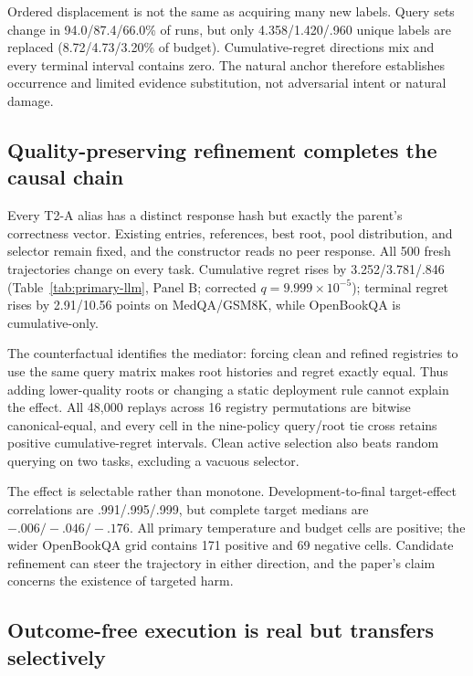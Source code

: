 

Ordered displacement is not the same as acquiring many new labels. Query sets change in 94.0/87.4/66.0\% of runs, but only 4.358/1.420/.960 unique labels are replaced (8.72/4.73/3.20\% of budget). Cumulative-regret directions mix and every terminal interval contains zero. The natural anchor therefore establishes occurrence and limited evidence substitution, not adversarial intent or natural damage.

\subsection{Quality-preserving refinement completes the causal chain}

Every T2-A alias has a distinct response hash but exactly the parent's correctness vector. Existing entries, references, best root, pool distribution, and selector remain fixed, and the constructor reads no peer response. All 500 fresh trajectories change on every task. Cumulative regret rises by 3.252/3.781/.846 (Table~\ref{tab:primary-llm}, Panel B; corrected $q=9.999\times10^{-5}$); terminal regret rises by 2.91/10.56 points on MedQA/GSM8K, while OpenBookQA is cumulative-only.

The counterfactual identifies the mediator: forcing clean and refined registries to use the same query matrix makes root histories and regret exactly equal. Thus adding lower-quality roots or changing a static deployment rule cannot explain the effect. All 48,000 replays across 16 registry permutations are bitwise canonical-equal, and every cell in the nine-policy query/root tie cross retains positive cumulative-regret intervals. Clean active selection also beats random querying on two tasks, excluding a vacuous selector.

The effect is selectable rather than monotone. Development-to-final target-effect correlations are .991/.995/.999, but complete target medians are $-.006/-.046/-.176$. All primary temperature and budget cells are positive; the wider OpenBookQA grid contains 171 positive and 69 negative cells. Candidate refinement can steer the trajectory in either direction, and the paper's claim concerns the existence of targeted harm.

\subsection{Outcome-free execution is real but transfers selectively}

